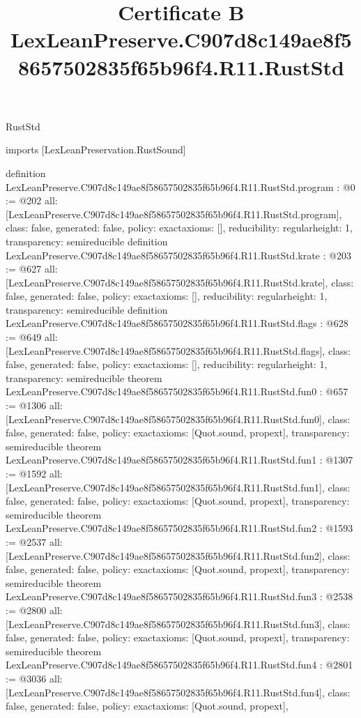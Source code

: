 \begin{lexlean}{RustStd}
\title{Certificate B LexLeanPreserve.C907d8c149ae8f58657502835f65b96f4.R11.RustStd}
\begin{coremodule}
imports [LexLeanPreservation.RustSound]

definition LexLeanPreserve.C907d8c149ae8f58657502835f65b96f4.R11.RustStd.program : @0 := @202 {
  all: [LexLeanPreserve.C907d8c149ae8f58657502835f65b96f4.R11.RustStd.program],
  class: false,
  generated: false,
  policy: exact{axioms: []},
  reducibility: regular{height: 1},
  transparency: semireducible
}
definition LexLeanPreserve.C907d8c149ae8f58657502835f65b96f4.R11.RustStd.krate : @203 := @627 {
  all: [LexLeanPreserve.C907d8c149ae8f58657502835f65b96f4.R11.RustStd.krate],
  class: false,
  generated: false,
  policy: exact{axioms: []},
  reducibility: regular{height: 1},
  transparency: semireducible
}
definition LexLeanPreserve.C907d8c149ae8f58657502835f65b96f4.R11.RustStd.flags : @628 := @649 {
  all: [LexLeanPreserve.C907d8c149ae8f58657502835f65b96f4.R11.RustStd.flags],
  class: false,
  generated: false,
  policy: exact{axioms: []},
  reducibility: regular{height: 1},
  transparency: semireducible
}
theorem LexLeanPreserve.C907d8c149ae8f58657502835f65b96f4.R11.RustStd.fun0 : @657 := @1306 {
  all: [LexLeanPreserve.C907d8c149ae8f58657502835f65b96f4.R11.RustStd.fun0],
  class: false,
  generated: false,
  policy: exact{axioms: [Quot.sound, propext]},
  transparency: semireducible
}
theorem LexLeanPreserve.C907d8c149ae8f58657502835f65b96f4.R11.RustStd.fun1 : @1307 := @1592 {
  all: [LexLeanPreserve.C907d8c149ae8f58657502835f65b96f4.R11.RustStd.fun1],
  class: false,
  generated: false,
  policy: exact{axioms: [Quot.sound, propext]},
  transparency: semireducible
}
theorem LexLeanPreserve.C907d8c149ae8f58657502835f65b96f4.R11.RustStd.fun2 : @1593 := @2537 {
  all: [LexLeanPreserve.C907d8c149ae8f58657502835f65b96f4.R11.RustStd.fun2],
  class: false,
  generated: false,
  policy: exact{axioms: [Quot.sound, propext]},
  transparency: semireducible
}
theorem LexLeanPreserve.C907d8c149ae8f58657502835f65b96f4.R11.RustStd.fun3 : @2538 := @2800 {
  all: [LexLeanPreserve.C907d8c149ae8f58657502835f65b96f4.R11.RustStd.fun3],
  class: false,
  generated: false,
  policy: exact{axioms: [Quot.sound, propext]},
  transparency: semireducible
}
theorem LexLeanPreserve.C907d8c149ae8f58657502835f65b96f4.R11.RustStd.fun4 : @2801 := @3036 {
  all: [LexLeanPreserve.C907d8c149ae8f58657502835f65b96f4.R11.RustStd.fun4],
  class: false,
  generated: false,
  policy: exact{axioms: [Quot.sound, propext]},
}
\end{coremodule}
\end{lexlean}
